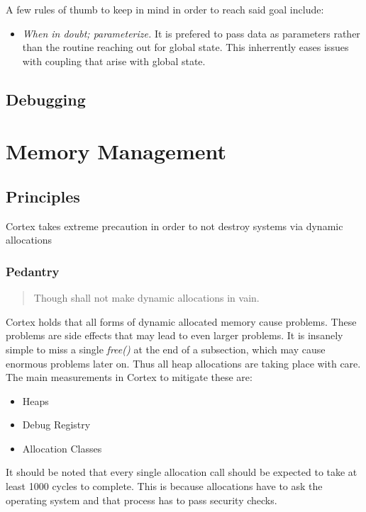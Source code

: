 \documentclass{report}
\begin{document}
A few rules of thumb to keep in mind in order to reach said goal include:
\begin{itemize}
    \item \emph{When in doubt; parameterize.}
    It is prefered to pass data as parameters rather than the routine reaching out for global state.
    This inherrently eases issues with coupling that arise with global state.
    
\end{itemize}

\section{Debugging}

\chapter{Memory Management}

\section{Principles}
Cortex takes extreme precaution in order to not destroy systems via dynamic allocations

\subsection{Pedantry}

\begin{quote}
    Though shall not make dynamic allocations in vain.
\end{quote}
Cortex holds that all forms of dynamic allocated memory cause problems. 
These problems are side effects that may lead to even larger problems. 
It is insanely simple to miss a single \textit{free()} at the end of a subsection, which may cause enormous problems later on.
Thus all heap allocations are taking place with care. 
The main measurements in Cortex to mitigate these are:
\begin{itemize}
    \item Heaps
    \item Debug Registry
    \item Allocation Classes
\end{itemize}
It should be noted that every single allocation call should be expected to take at least 1000 cycles to complete.
This is because allocations have to ask the operating system and that process has to pass security checks.
\end{document}

